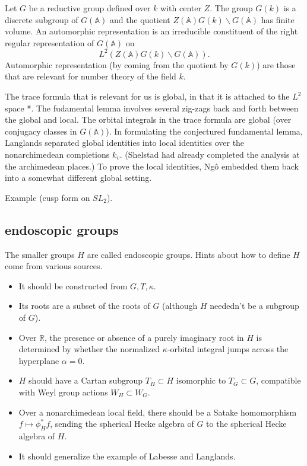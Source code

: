 \documentclass[brochure,english,12pt]{bourbaki}
\newcommand{\ring}[1]{\mathbb{#1}}
\def\A{\ring{A}}
\begin{document}
Let $G$ be a reductive group defined over $k$ with center $Z$.  The
group $G(k)$ is a discrete subgroup of $G(\A)$ and the quotient
$Z(\A)G(k)\backslash G(\A)$ has finite volume.  An automorphic
representation is an irreducible constituent of the right regular
representation of $G(\A)$ on 
\[
L^2(Z(\A) G(k)\backslash G(\A)).
\]
Automorphic representation (by coming from the quotient by $G(k)$) are
those that are relevant for number theory of the field $k$.

The trace formula that is relevant for us is global, in that it is attached to the $L^2$ space *.
The fudamental lemma involves several zig-zags back and forth between the global and local.
The orbital integrals in the trace formula are global (over conjugacy classes in $G(\A)$).
In formulating the conjectured fundamental lemma, Langlands separated global
identities into local identities
over the nonarchimedean completions $k_v$.  (Shelstad had already completed the analysis
at the archimedean places.)  To prove the local identities, Ng\^o embedded them back
into a somewhat different global setting.

Example (cusp form on $SL_2$).





\subsection{endoscopic groups}

The
smaller groups $H$ are called endoscopic groups.
Hints about how to define $H$ come from various sources.
\begin{itemize}
\item It should be constructed from $G,T,\kappa$.
\item Its roots are a subset of the roots of $G$ (although $H$ neededn't
be a subgroup of $G$).
\item Over $\ring{R}$, the presence or absence of a purely imaginary
root in $H$ is determined by whether the normalized $\kappa$-orbital
integral jumps across the hyperplane $\alpha=0$.
\item $H$ should have a Cartan subgroup $T_H\subset H$ isomorphic to
$T_G\subset G$, compatible with Weyl group actions $W_H\subset W_G$.
\item Over a nonarchimedean local field, there should be a Satake
homomorphism $f \mapsto \phi^*_Hf$, sending the spherical Hecke algebra
of $G$ to the spherical Hecke algebra of $H$.
\item It should generalize the example of Labesse and Langlands.
\end{itemize}
\end{document}
